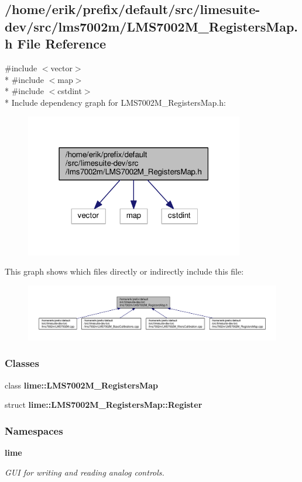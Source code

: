 \subsection{/home/erik/prefix/default/src/limesuite-\/dev/src/lms7002m/\+L\+M\+S7002\+M\+\_\+\+Registers\+Map.h File Reference}
\label{LMS7002M__RegistersMap_8h}
{\ttfamily \#include $<$vector$>$}\\*
{\ttfamily \#include $<$map$>$}\\*
{\ttfamily \#include $<$cstdint$>$}\\*
Include dependency graph for L\+M\+S7002\+M\+\_\+\+Registers\+Map.\+h\+:
\nopagebreak
\begin{figure}[H]
\begin{center}
\leavevmode
\includegraphics[width=271pt]{d2/d03/LMS7002M__RegistersMap_8h__incl}
\end{center}
\end{figure}
This graph shows which files directly or indirectly include this file\+:
\nopagebreak
\begin{figure}[H]
\begin{center}
\leavevmode
\includegraphics[width=350pt]{d1/db5/LMS7002M__RegistersMap_8h__dep__incl}
\end{center}
\end{figure}
\subsubsection*{Classes}
\begin{DoxyCompactItemize}
\item 
class {\bf lime\+::\+L\+M\+S7002\+M\+\_\+\+Registers\+Map}
\item 
struct {\bf lime\+::\+L\+M\+S7002\+M\+\_\+\+Registers\+Map\+::\+Register}
\end{DoxyCompactItemize}
\subsubsection*{Namespaces}
\begin{DoxyCompactItemize}
\item 
 {\bf lime}
\begin{DoxyCompactList}\small\item\em G\+UI for writing and reading analog controls. \end{DoxyCompactList}\end{DoxyCompactItemize}
